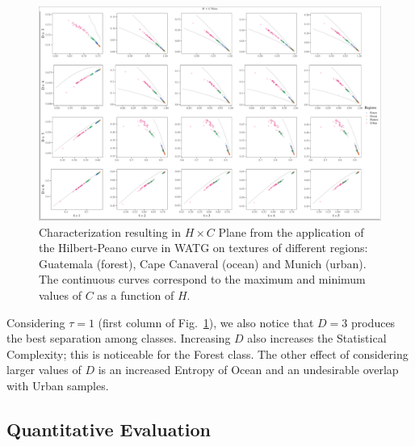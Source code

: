 \documentclass[journal]{IEEEtran}
\begin{document}
	\begin{figure}
		\centering
		\includegraphics[width=1\textwidth]{Figures/WATGHC.pdf}
		\caption{Characterization resulting in $H \times C$ Plane from the application of the Hilbert-Peano curve in WATG on textures of different regions: Guatemala (forest), Cape Canaveral (ocean) and Munich (urban). 
			The continuous curves correspond to the maximum and minimum values of $C$ as a function of $H$.}
		\label{fig:Regions}
	\end{figure}
	
	Considering $\tau=1$ (first column of Fig.~\ref{fig:Regions}), 
	we also notice that $D=3$ produces the best separation among classes.
	Increasing $D$ also increases the Statistical Complexity; this is noticeable for the Forest class.
	The other effect of considering larger values of $ D $ is an increased Entropy of Ocean and an undesirable overlap with Urban samples.
	
	\subsection{Quantitative Evaluation}
	
\end{document}
